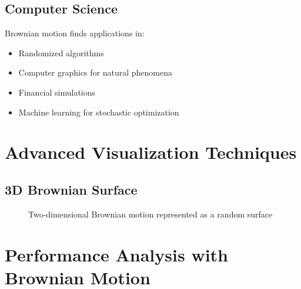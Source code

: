 \documentclass[12pt,a4paper,twoside]{article}
\theoremstyle{definition}
\begin{document}
\subsection{Computer Science}

Brownian motion finds applications in:
\begin{itemize}
\item Randomized algorithms
\item Computer graphics for natural phenomena
\item Financial simulations
\item Machine learning for stochastic optimization
\end{itemize}

\section{Advanced Visualization Techniques}

\subsection{3D Brownian Surface}

\begin{figure}[H]
\centering
{}
\caption{Two-dimensional Brownian motion represented as a random surface}
\label{fig:2d-brownian-surface}
\end{figure}

\section{Performance Analysis with Brownian Motion}
\end{document}
